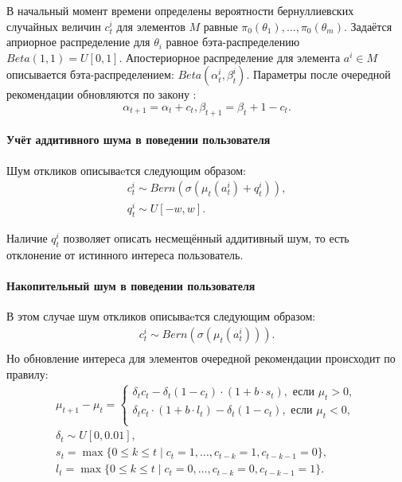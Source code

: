 \documentclass[12pt, twoside]{article}
\begin{document}
В начальный момент времени определены вероятности бернуллиевских случайных величин $c_t^i$ для элементов $M$ равные $\pi_0(\theta_1), \dots, \pi_0(\theta_m)$. 
Задаётся априорное распределение для $\theta_i$ равное бэта-распределению $Beta(1, 1) = U[0, 1]$. 
Апостериорное распределение для элемента $a^i \in M$ описывается бэта-распределением: $Beta(\alpha_t^i, \beta_t^i)$. 
Параметры после очередной рекомендации обновляются по закону :
\begin{equation}\label{eq3}
\alpha_{t+1} = \alpha_t + c_t, \beta_{t+1} = \beta_t + 1 - c_t.
\end{equation}

\paragraph{Учёт аддитивного шума в поведении пользователя}
Шум откликов описываeтся следующим образом: 
\begin{gather*}
  c_t^i \sim Bern \left(\sigma(\mu_t(a_t^i) + q_t^i) \right), \\
  q_t^i \sim U[-w, w].
\end{gather*}

Наличие $q_t^i$ позволяет описать несмещённый аддитивный шум, то есть отклонение от истинного интереса пользователь. 

\paragraph{Накопительный шум в поведении пользователя}
В этом случае шум откликов описываeтся следующим образом: 
\begin{gather*}
  c_t^i \sim Bern \left(\sigma(\mu_t(a_t^i)) \right). \\
\end{gather*}
Но обновление интереса для элементов очередной рекомендации происходит по правилу: 
\begin{gather*}  
  \mu_{t+1} - \mu_{t} = 
  \begin{cases} 
    \delta_t c_t  - \delta_t (1 - c_t) \cdot (1 + b \cdot s_t), \text{ если } \mu_t > 0, \\
    \delta_t c_t \cdot (1 + b \cdot l_t) - \delta_t (1 - c_t), \text{ если } \mu_t < 0, \\
  \end{cases} \\
  \delta_t \sim U[0, 0.01], \\
  s_t = \max \{0 \leq k \leq t \mid c_{t} = 1, \dots, c_{t-k} = 1, c_{t-k-1} = 0 \},\\
  l_t = \max \{0 \leq k \leq t \mid c_{t} = 0, \dots, c_{t-k} = 0, c_{t-k-1} = 1 \}.\\
\end{gather*}
\end{document}
